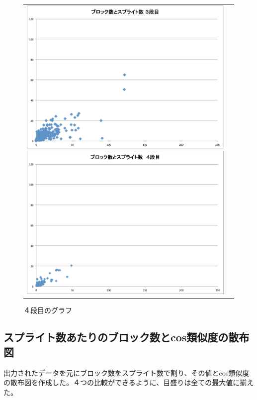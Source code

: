 \documentclass[a4paper,10pt,onecolumn,oneside,openany]{jsbook}
\begin{document}
\begin{figure}[h]
\begin{tabular}{cc}
\begin{minipage}[t]{0.45\hsize}
	 \centering
	 \includegraphics[keepaspectratio, scale = 0.25]{block_splite_3.pdf}
	 \caption{３段目のグラフ}
	 \label{third_block_splite}
	\end{minipage}
        \begin{minipage}[t]{0.45\hsize}
	 \centering
	 \includegraphics[keepaspectratio, scale = 0.25]{block_splite_4.pdf}
	 \caption{４段目のグラフ}
	 \label{fourth_block_splite}
	\end{minipage}
 \end{tabular}
 \end{figure}

\newpage
 \subsection{スプライト数あたりのブロック数とcos類似度の散布図}
出力されたデータを元にブロック数をスプライト数で割り、その値とcos類似度の散布図を作成した。４つの比較ができるように、目盛りは全ての最大値に揃えた。
\end{document}
